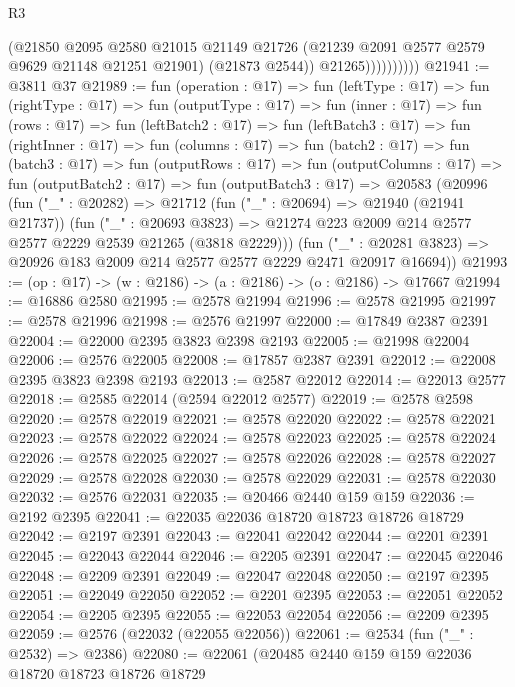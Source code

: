 \begin{lexlean}{R3}
\begin{coremodule}
                        (@21850
                          @2095
                          @2580
                          @21015
                          @21149
                          @21726
                          (@21239 @2091 @2577 @2579 @9629 @21148 @21251 @21901)
                          (@21873 @2544))
                        @21265))))))))))
@21941 := @3811 @37
@21989 := fun (operation : @17) =>
  fun (leftType : @17) =>
  fun (rightType : @17) =>
  fun (outputType : @17) =>
  fun (inner : @17) =>
  fun (rows : @17) =>
  fun (leftBatch2 : @17) =>
  fun (leftBatch3 : @17) =>
  fun (rightInner : @17) =>
  fun (columns : @17) =>
  fun (batch2 : @17) =>
  fun (batch3 : @17) =>
  fun (outputRows : @17) =>
  fun (outputColumns : @17) =>
  fun (outputBatch2 : @17) =>
  fun (outputBatch3 : @17) =>
  @20583
    (@20996
      (fun ("_" : @20282) =>
      @21712
        (fun ("_" : @20694) => @21940 (@21941 @21737))
        (fun ("_" : @20693 @3823) =>
        @21274 @223 @2009 @214 @2577 @2577 @2229 @2539 @21265 (@3818 @2229)))
      (fun ("_" : @20281 @3823) => @20926 @183 @2009 @214 @2577 @2577 @2229 @2471 @20917 @16694))
@21993 := (op : @17) -> (w : @2186) -> (a : @2186) -> (o : @2186) -> @17667
@21994 := @16886 @2580
@21995 := @2578 @21994
@21996 := @2578 @21995
@21997 := @2578 @21996
@21998 := @2576 @21997
@22000 := @17849 @2387 @2391
@22004 := @22000 @2395 @3823 @2398 @2193
@22005 := @21998 @22004
@22006 := @2576 @22005
@22008 := @17857 @2387 @2391
@22012 := @22008 @2395 @3823 @2398 @2193
@22013 := @2587 @22012
@22014 := @22013 @2577
@22018 := @2585 @22014 (@2594 @22012 @2577)
@22019 := @2578 @2598
@22020 := @2578 @22019
@22021 := @2578 @22020
@22022 := @2578 @22021
@22023 := @2578 @22022
@22024 := @2578 @22023
@22025 := @2578 @22024
@22026 := @2578 @22025
@22027 := @2578 @22026
@22028 := @2578 @22027
@22029 := @2578 @22028
@22030 := @2578 @22029
@22031 := @2578 @22030
@22032 := @2576 @22031
@22035 := @20466 @2440 @159 @159
@22036 := @2192 @2395
@22041 := @22035 @22036 @18720 @18723 @18726 @18729
@22042 := @2197 @2391
@22043 := @22041 @22042
@22044 := @2201 @2391
@22045 := @22043 @22044
@22046 := @2205 @2391
@22047 := @22045 @22046
@22048 := @2209 @2391
@22049 := @22047 @22048
@22050 := @2197 @2395
@22051 := @22049 @22050
@22052 := @2201 @2395
@22053 := @22051 @22052
@22054 := @2205 @2395
@22055 := @22053 @22054
@22056 := @2209 @2395
@22059 := @2576 (@22032 (@22055 @22056))
@22061 := @2534 (fun ("_" : @2532) => @2386)
@22080 := @22061
    (@20485
      @2440
      @159
      @159
      @22036
      @18720
      @18723
      @18726
      @18729

\end{coremodule}
\end{lexlean}
